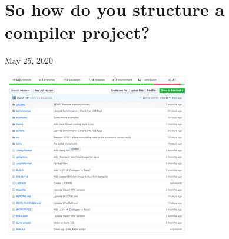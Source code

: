 %
%
%
%
%
%

\hypertarget{top-of-page}{%
\chapter{So how do you structure a compiler
project?}\label{top-of-page}}


May 25, 2020

%

\includegraphics[width=\linewidth]{02_files/repo-overview.png}

